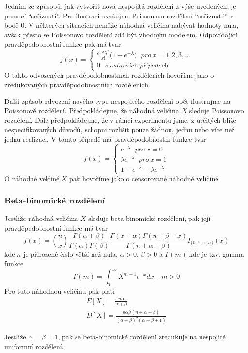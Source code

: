 Jedním ze způsobů, jak vytvořit nová nespojitá rozdělení z výše uvedených, je pomocí ``seříznutí''. Pro ilustraci uvažujme Poissonovo rozdělení ``seříznuté'' v bodě 0. V některých situacích nemůže náhodná veličina nabývat hodnoty nula, avšak přesto se Poissonovo rozdělení zdá být vhodným modelem. Odpovídající pravděpodobnostní funkce pak má tvar
\begin{equation*}
f(x) =
\begin{cases}
\frac{e^{-\lambda} \lambda^x}{x!}\big(1 - e^{-\lambda} \big)~~~\textit{pro}~x = 1, 2, 3, ...\\
0~~~\textit{v ostatních případech}
\end{cases}
\end{equation*}
O takto odvozených pravděpodobnostních rozděleních hovoříme jako o zredukovaných pravděpodobnostních rozděleních.

Další způsob odvození nového typu nespojitého rozdělení opět ilustrujme na Poissonově rozdělení. Předpokládejme, že náhodná veličina $X$ sleduje Poissonovo rozdělení. Dále předpokládejme, že v rámci experimentu jsme, z určitých blíže nespecifikovaných důvodů, schopni rozlišit pouze žádnou, jednu nebo více než jednu realizaci. V tomto případě má pravděpodobnostní funkce tvar
\begin{equation*}
f(x) =
\begin{cases}
e^{-\lambda}~~~\textit{pro}~ x = 0\\
\lambda e^{-\lambda}~~~\textit{pro}~ x = 1\\
1 - e^{-\lambda} - \lambda e^{-\lambda}
\end{cases}
\end{equation*}
O náhodné velčině $X$ pak hovoříme jako o censorované náhodné veličině.

\subsubsection{Beta-binomické rozdělení}

\begin{definition}
Jestliže náhodná veličina $X$ sleduje beta-binomické rozdělení, pak její pravděpodobnostní funkce má tvar
\begin{equation*}
f(x) = \binom{n}{x} \frac{\Gamma(\alpha + \beta)}{\Gamma(\alpha) \Gamma(\beta)}\frac{\Gamma(x + \alpha) \Gamma(n + \beta - x)}{\Gamma(n + \alpha + \beta)}I_{\{0,1,...,n\}}(x)
\end{equation*}
kde $n$ je přirozené číslo větší než nula, $\alpha > 0$, $\beta > 0$ a $\Gamma(m)$ kde je tzv. gamma funkce
\begin{equation*}
\Gamma(m) = \int_0^{\infty}X^{m-1}e^{-x}dx,~~~ m > 0
\end{equation*}
Pro tuto náhodnou veličinu pak platí
\begin{gather*}
E[X] = \frac{n \alpha}{\alpha + \beta}\\
D[X] = \frac{n \alpha \beta (n + \alpha + \beta)}{(\alpha + \beta)^2(\alpha + \beta + 1)}
\end{gather*}
\end{definition}
Jestliže $\alpha = \beta = 1$, pak se beta-binomické rozdělení zredukuje na nespojité uniformní rozdělení.

